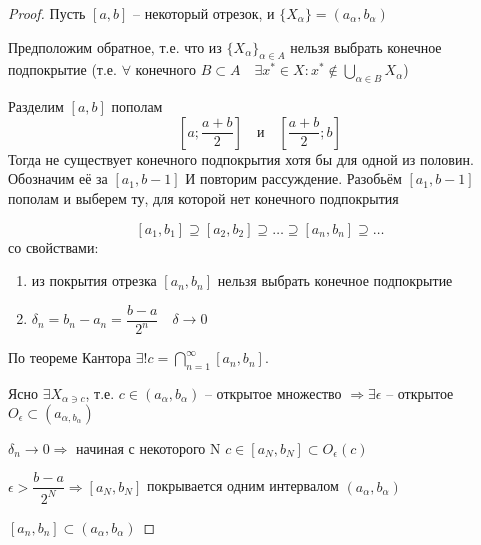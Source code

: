 \documentclass{book}
\begin{document}
\begin{proof}
	Пусть $[a, b]$ -- некоторый отрезок, и $\{X_{\alpha}\}= (a_{\alpha}, b_{\alpha})$
	
	Предположим обратное, т.е.  что из $\{X_{\alpha}\}_{\alpha \in A}$ нельзя выбрать конечное подпокрытие (т.е. $\forall$ конечного $B \subset A\quad \exists x^* \in X:x^* \notin \bigcup_{\alpha \in B}X_{\alpha}$)
	
	Разделим $[a, b]$ пополам 
	$$[a; \dfrac{a+b}{2}] \quad\texttt{и}\quad [\dfrac{a+b}{2};b]$$
	Тогда не существует конечного подпокрытия хотя бы для одной из половин. Обозначим её за $[a_1, b-1]$ И повторим рассуждение. Разобьём $[a_1, b-1]$ пополам и выберем ту, для которой нет конечного подпокрытия
	
	$$[a_1, b_1] \supseteq [a_2, b_2]\supseteq \ldots \supseteq [a_n, b_n]\supseteq \ldots$$
	со свойствами:
	\begin{enumerate}
		\item из покрытия отрезка $[a_n, b_n]$ нельзя выбрать конечное подпокрытие
		\item $\delta_n = b_n - a_n = \dfrac{b-a}{2^n}\quad \delta \rightarrow 0$
	\end{enumerate}
	
	По теореме Кантора $\exists ! {c}=\bigcap_{n=1}^{\infty}[a_n, b_n]$.
	
	Ясно $\exists X_{\alpha \ni c}$, т.е. $c \in (a_{\alpha}, b_{\alpha})$ -- открытое множество $\Rightarrow \exists \epsilon$ -- открытое $O_{\epsilon} \subset (a_{\alpha, b_{\alpha}})$
	
	$\delta_n \rightarrow 0 \Rightarrow$ начиная с некоторого N $c \in [a_N, b_N]\subset O_{\epsilon}(c)$
	
	$\epsilon > \dfrac{b-a}{2^N}\Rightarrow [a_N, b_N]$ покрывается одним интервалом $(a_{\alpha}, b_{\alpha})$
	
	$[a_n, b_n]\subset (a_{\alpha}, b_{\alpha})$
\end{proof}
\end{document}
